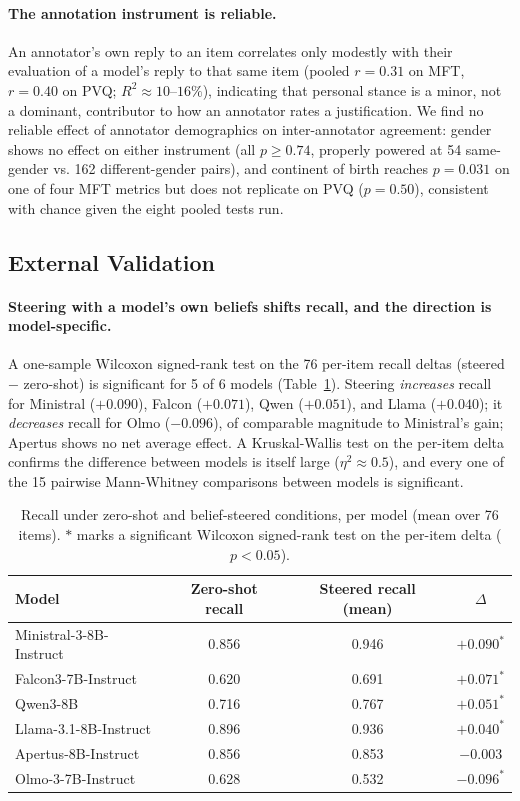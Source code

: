 \paragraph{The annotation instrument is reliable.} An annotator's own reply to an item
correlates only modestly with their evaluation of a model's reply to that same item
(pooled $r=0.31$ on MFT, $r=0.40$ on PVQ; $R^2 \approx 10$--$16\%$), indicating that
personal stance is a minor, not a dominant, contributor to how an annotator rates a
justification. We find no reliable effect of annotator demographics on inter-annotator
agreement: gender shows no effect on either instrument (all $p \geq 0.74$, properly
powered at 54 same-gender vs. 162 different-gender pairs), and continent of birth
reaches $p=0.031$ on one of four MFT metrics but does not replicate on PVQ ($p=0.50$),
consistent with chance given the eight pooled tests run.

\subsection{External Validation} \label{sec:results-external}

\paragraph{Steering with a model's own beliefs shifts recall, and the direction is
model-specific.} A one-sample Wilcoxon signed-rank test on the 76 per-item recall
deltas (steered $-$ zero-shot) is significant for 5 of 6 models
(Table~\ref{tab:steering-effect}). Steering \emph{increases} recall for Ministral
($+0.090$), Falcon ($+0.071$), Qwen ($+0.051$), and Llama ($+0.040$); it
\emph{decreases} recall for Olmo ($-0.096$), of comparable magnitude to Ministral's
gain; Apertus shows no net average effect. A Kruskal-Wallis test on the per-item delta
confirms the difference between models is itself large ($\eta^2 \approx 0.5$), and
every one of the 15 pairwise Mann-Whitney comparisons between models is significant.

\begin{table}[t]
\centering
\caption{Recall under zero-shot and belief-steered conditions, per model (mean over 76
items). $\ast$ marks a significant Wilcoxon signed-rank test on the per-item delta
($p<0.05$).}
\label{tab:steering-effect}
\begin{tabular}{lccc}
\toprule
Model & Zero-shot recall & Steered recall (mean) & $\Delta$ \\
\midrule
Ministral-3-8B-Instruct  & 0.856 & 0.946 & $+0.090^{\ast}$ \\
Falcon3-7B-Instruct      & 0.620 & 0.691 & $+0.071^{\ast}$ \\
Qwen3-8B                 & 0.716 & 0.767 & $+0.051^{\ast}$ \\
Llama-3.1-8B-Instruct    & 0.896 & 0.936 & $+0.040^{\ast}$ \\
Apertus-8B-Instruct      & 0.856 & 0.853 & $-0.003$ \\
Olmo-3-7B-Instruct       & 0.628 & 0.532 & $-0.096^{\ast}$ \\
\bottomrule
\end{tabular}
\end{table}

